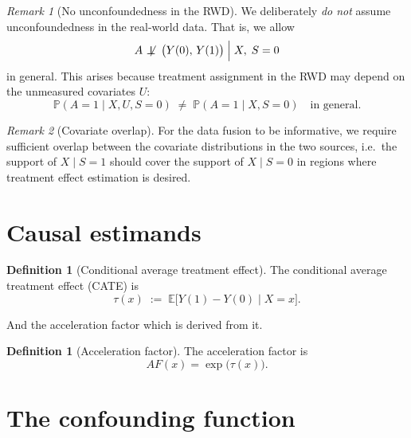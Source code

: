 \documentclass[11pt]{article}
\theoremstyle{plain}
\theoremstyle{definition}
\newtheorem{definition}[theorem]{Definition}
\theoremstyle{remark}
\newcommand{\E}{\mathbb{E}}
\newcommand{\1}{\mathds{1}}
\newcommand{\p}{\mathbb{P}}
\theoremstyle{plain}
\theoremstyle{remark}
\newtheorem{remark}{Remark}
\newcommand{\indep}{\perp\!\!\!\!\!\perp}
\newcommand{\CATE}{\tau}
\begin{document}
\begin{remark}[No unconfoundedness in the RWD]
  We deliberately \emph{do not} assume unconfoundedness in the real-world data. That is, we allow
  \begin{equation}\label{eq:confounded_rwd}
    A \;\not\!\indep\; \bigl(Y(0),\, Y(1)\bigr) \;\Big|\; X,\; S = 0
  \end{equation}
  in general. This arises because treatment assignment in the RWD may depend on the unmeasured covariates $U$:
  \begin{equation}\label{eq:rwd_treatment}
    \p(A = 1 \mid X, U, S = 0) \;\neq\; \p(A = 1 \mid X, S = 0) \quad \text{in general}.
  \end{equation}
\end{remark}

\begin{remark}[Covariate overlap]
  For the data fusion to be informative, we require sufficient overlap between the covariate distributions in the two sources, i.e.\ the support of $X \mid S=1$ should cover the support of $X \mid S=0$ in regions where treatment effect estimation is desired.
\end{remark}

\section{Causal estimands}

\begin{definition}[Conditional average treatment effect]
  The conditional average treatment effect (CATE) is
  \begin{equation}\label{eq:cate}
    \CATE(x) \;:=\; \E\bigl[Y(1) - Y(0) \mid X = x\bigr].
  \end{equation}
\end{definition}

And the acceleration factor which is derived from it.
\begin{definition}[Acceleration factor]
  The acceleration factor is
  \begin{equation}\label{eq:acceleration}
    AF(x) = \exp\bigl(\CATE(x)\bigr).
  \end{equation}
\end{definition}


\section{The confounding function}
\end{document}
